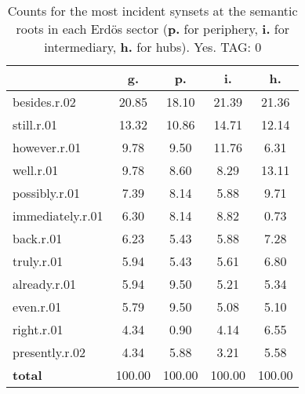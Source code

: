 \begin{table}[h!]
\begin{center}
\begin{tabular}{| l || c | c | c | c |}\hline
 & {\bf g.} & {\bf p.} & {\bf i.} & {\bf h.} \\\hline\hline
besides.r.02 & 20.85  & 18.10  & 21.39  & 21.36 \\\hline
still.r.01 & 13.32  & 10.86  & 14.71  & 12.14 \\\hline
however.r.01 & 9.78  & 9.50  & 11.76  & 6.31 \\\hline
well.r.01 & 9.78  & 8.60  & 8.29  & 13.11 \\\hline
possibly.r.01 & 7.39  & 8.14  & 5.88  & 9.71 \\\hline
immediately.r.01 & 6.30  & 8.14  & 8.82  & 0.73 \\\hline
back.r.01 & 6.23  & 5.43  & 5.88  & 7.28 \\\hline
truly.r.01 & 5.94  & 5.43  & 5.61  & 6.80 \\\hline
already.r.01 & 5.94  & 9.50  & 5.21  & 5.34 \\\hline
even.r.01 & 5.79  & 9.50  & 5.08  & 5.10 \\\hline
right.r.01 & 4.34  & 0.90  & 4.14  & 6.55 \\\hline
presently.r.02 & 4.34  & 5.88  & 3.21  & 5.58 \\\hline\hline
{{\bf total}} & 100.00  & 100.00  & 100.00  & 100.00 \\\hline
\end{tabular}
\caption{Counts for the most incident synsets at the semantic roots in each Erd\"os sector ({\bf p.} for periphery, {\bf i.} for intermediary, {\bf h.} for hubs). Yes. TAG: 0}
\end{center}
\end{table}